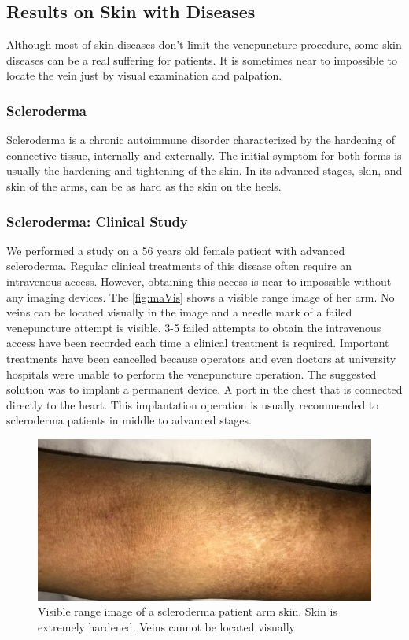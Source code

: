 \subsection{Results on Skin with Diseases}

Although most of skin diseases don’t limit the venepuncture procedure, some skin diseases can be a real suffering for patients. It is sometimes near to impossible to locate the vein just by visual examination and palpation.

\subsubsection{Scleroderma}
Scleroderma is a chronic autoimmune disorder characterized by the hardening of connective tissue, internally and externally. The initial symptom for both forms is usually the hardening and tightening of the skin. In its advanced stages, skin, and skin of the arms, can be as hard as the skin on the heels. 

\subsubsection{Scleroderma: Clinical Study}
We performed a study on a 56 years old female patient with advanced scleroderma. Regular clinical treatments of this disease often require an intravenous access. However, obtaining this access is near to impossible without any imaging devices. The \autoref{fig:maVis} shows a visible range image of her arm. No veins can be located visually in the image and a needle mark of a failed venepuncture attempt is visible. 3-5 failed attempts to obtain the intravenous access have been recorded each time a clinical treatment is required. Important treatments have been cancelled because operators and even doctors at university hospitals were unable to perform the venepuncture operation. The suggested solution was to implant a permanent device. A port in the chest that is connected directly to the heart. This implantation operation is usually recommended to scleroderma patients in middle to advanced stages.


\begin{figure}[H]
\centering
\includegraphics[scale=0.8]{figures/maVis.JPG}
\caption[Visible range image of a scleroderma patient arm skin]{Visible range image of a scleroderma patient arm skin. Skin is extremely hardened. Veins cannot be located visually}\label{fig:maVis}
\end{figure}


